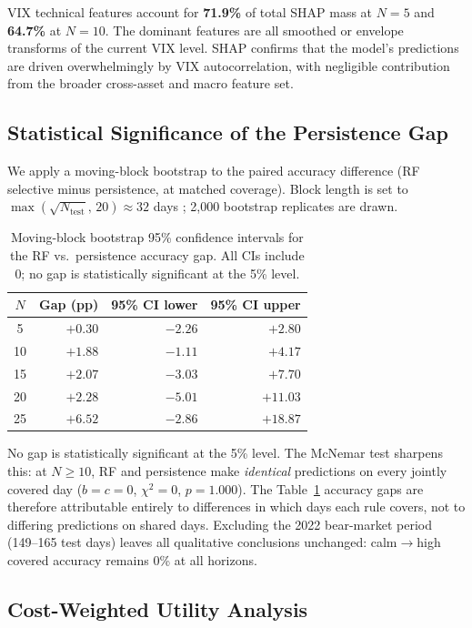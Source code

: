 \documentclass[12pt]{article}
\begin{document}
VIX technical features account for \textbf{71.9\%} of total SHAP mass at $N = 5$ and
\textbf{64.7\%} at $N = 10$. The dominant features are all smoothed or envelope transforms of
the current VIX level. SHAP confirms that the model's predictions are driven overwhelmingly by
VIX autocorrelation, with negligible contribution from the broader cross-asset and macro feature
set.

\subsection{Statistical Significance of the Persistence Gap}
\label{sec:bootstrap}

We apply a moving-block bootstrap to the paired accuracy difference (RF selective minus
persistence, at matched coverage). Block length is set to $\max(\sqrt{N_\text{test}},\, 20)
\approx 32$ days \citep{kunsch1989}; 2,000 bootstrap replicates are drawn.

\begin{table}[H]
\centering
\caption{Moving-block bootstrap 95\% confidence intervals for the RF vs.\ persistence accuracy
gap. All CIs include 0; no gap is statistically significant at the 5\% level.}
\label{tab:boot}
\begin{tabular}{crrr}
\toprule
$N$ & Gap (pp) & 95\% CI lower & 95\% CI upper \\
\midrule
5  & $+0.30$ & $-2.26$ & $+2.80$ \\
10 & $+1.88$ & $-1.11$ & $+4.17$ \\
15 & $+2.07$ & $-3.03$ & $+7.70$ \\
20 & $+2.28$ & $-5.01$ & $+11.03$ \\
25 & $+6.52$ & $-2.86$ & $+18.87$ \\
\bottomrule
\end{tabular}
\end{table}

No gap is statistically significant at the 5\% level. The McNemar test sharpens this: at
$N \geq 10$, RF and persistence make \emph{identical} predictions on every jointly covered day
($b = c = 0$, $\chi^2 = 0$, $p = 1.000$). The Table~\ref{tab:boot} accuracy gaps are therefore
attributable entirely to differences in which days each rule covers, not to differing predictions
on shared days. Excluding the 2022 bear-market period (149--165 test days) leaves all qualitative
conclusions unchanged: calm$\to$high covered accuracy remains 0\% at all horizons.

\subsection{Cost-Weighted Utility Analysis}
\label{sec:utility}
\end{document}
